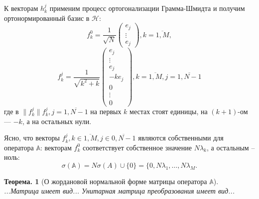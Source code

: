 \documentclass{article}
\newtheorem{thm}{Теорема. }
\begin{document}
К векторам \( h_k^j \) применим процесс ортогонализации Грамма-Шмидта и получим
ортонормированный базис в \( \mathcal{H} \):
\[ f_k^0 = \frac{1}{\sqrt{N}} \begin{pmatrix} e_j \\ \vdots \\ e_j \end{pmatrix}, k=\overline{1,M}, \]
\[
    f_k^j = \frac{1}{\sqrt{k^2+k}}
    \begin{pmatrix} e_j \\ \vdots \\ e_j \\ -ke_j \\ 0 \\ \vdots \\ 0 \end{pmatrix}, k=\overline{1,M}, j=\overline{1,N-1} \]
где в \( \|f_k^j\| f_k^j, j=\overline{1,N-1} \) на первых \( k \) местах стоят единицы, на \((k+1)\)-ом --- \( -k \),
а на остальных нули.

Ясно, что векторы \( f_k^j, k\in\overline{1,M}, j\in\overline{0,N-1} \)
являются собственными для оператора \( \mathbb{A} \):
векторам \( f_k^0 \) соответствует собственное значение \( N \lambda_k \),
а остальным -- ноль:
\[ \sigma(\mathbb{A}) = N \sigma(A)\cup\{0\} = \{ 0, N\lambda_1, \ldots, N\lambda_M. \]

\begin{thm}[О жордановой нормальной форме матрицы  оператора \( \mathbb{A} \)]
    ...Матрица имеет вид... Унитарная матрица преобразования имеет вид...
\end{thm}
\end{document}
